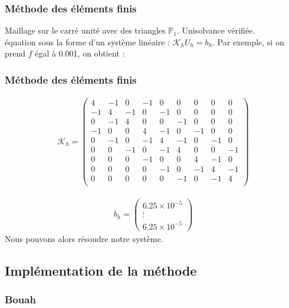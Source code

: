 \documentclass[handout]{beamer}
\begin{document}
\begin{frame}
	\frametitle{Méthode des éléments finis}
Maillage sur le carré unité avec des triangles $\mathbb{P}_{1}$. Unisolvance vérifiée.\\
équation sous la forme d'un système linéaire : $\mathcal{K}_{h}U_{h}=b_{h}$. Par exemple, si on prend $f$ égal à 0.001, on obtient :
\end{frame}

\begin{frame}
	\frametitle{Méthode des éléments finis}\begin{align*}
\mathcal{K}_{h}=\left(
\begin{matrix}
4  &    -1    &  0   &   -1    &  0  &    0   &   0  &    0  &    0\\
-1   &   4  &    -1  &    0     & -1  &    0  &    0  &    0  &    0\\
0    &  -1    &  4   &   0    &  0   &   -1 &     0   &   0 &     0\\
-1  &    0   &   0    &  4   &   -1 &     0   &   -1  &    0  &    0\\
0  &    -1   &   0   &   -1  &    4    &  -1  &    0   &   -1  &    0\\
0   &   0  &    -1   &   0   &   -1  &    4   &   0  &    0  &    -1\\
0   &   0   &   0   &   -1    &  0    &  0  &    4   &   -1   &   0\\
0    &  0    &  0   &   0    &  -1    &  0   &   -1  &    4    &  -1\\
0    &  0  &    0   &   0    &  0   &   -1   &   0    &  -1   &   4\\
\end{matrix}\right)
\end{align*}

\begin{align*}
b_h =\left(
\begin{matrix}
6.25\times 10^{-5}\\
\vdots\\
6.25\times 10^{-5}
\end{matrix}\right)
\end{align*}
Nous pouvons alors résoudre notre système.
\end{frame}

\subsection[Implém.]{Implémentation de la méthode}
\begin{frame}
	\frametitle{Bouah}

\end{frame}
\end{document}
